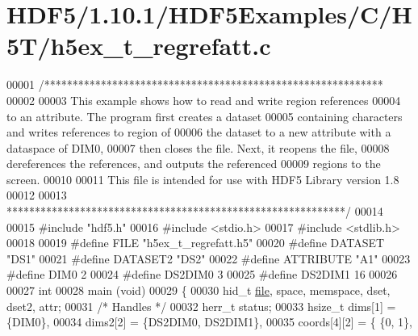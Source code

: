 \hypertarget{_h_d_f5_21_810_81_2_h_d_f5_examples_2_c_2_h5_t_2h5ex__t__regrefatt_8c_source}{}\section{H\+D\+F5/1.10.1/\+H\+D\+F5\+Examples/\+C/\+H5\+T/h5ex\+\_\+t\+\_\+regrefatt.c}
\label{_h_d_f5_21_810_81_2_h_d_f5_examples_2_c_2_h5_t_2h5ex__t__regrefatt_8c_source}

\begin{DoxyCode}
00001 \textcolor{comment}{/************************************************************}
00002 \textcolor{comment}{}
00003 \textcolor{comment}{  This example shows how to read and write region references}
00004 \textcolor{comment}{  to an attribute.  The program first creates a dataset}
00005 \textcolor{comment}{  containing characters and writes references to region of}
00006 \textcolor{comment}{  the dataset to a new attribute with a dataspace of DIM0,}
00007 \textcolor{comment}{  then closes the file.  Next, it reopens the file,}
00008 \textcolor{comment}{  dereferences the references, and outputs the referenced}
00009 \textcolor{comment}{  regions to the screen.}
00010 \textcolor{comment}{}
00011 \textcolor{comment}{  This file is intended for use with HDF5 Library version 1.8}
00012 \textcolor{comment}{}
00013 \textcolor{comment}{ ************************************************************/}
00014 
00015 \textcolor{preprocessor}{#include "hdf5.h"}
00016 \textcolor{preprocessor}{#include <stdio.h>}
00017 \textcolor{preprocessor}{#include <stdlib.h>}
00018 
00019 \textcolor{preprocessor}{#define FILE            "h5ex\_t\_regrefatt.h5"}
00020 \textcolor{preprocessor}{#define DATASET         "DS1"}
00021 \textcolor{preprocessor}{#define DATASET2        "DS2"}
00022 \textcolor{preprocessor}{#define ATTRIBUTE       "A1"}
00023 \textcolor{preprocessor}{#define DIM0            2}
00024 \textcolor{preprocessor}{#define DS2DIM0         3}
00025 \textcolor{preprocessor}{#define DS2DIM1         16}
00026 
00027 \textcolor{keywordtype}{int}
00028 main (\textcolor{keywordtype}{void})
00029 \{
00030     hid\_t               \hyperlink{structfile}{file}, space, memspace, dset, dset2, attr;
00031                                                     \textcolor{comment}{/* Handles */}
00032     herr\_t              status;
00033     hsize\_t             dims[1] = \{DIM0\},
00034                         dims2[2] = \{DS2DIM0, DS2DIM1\},
00035                         coords[4][2] = \{ \{0,  1\},

\end{DoxyCode}
